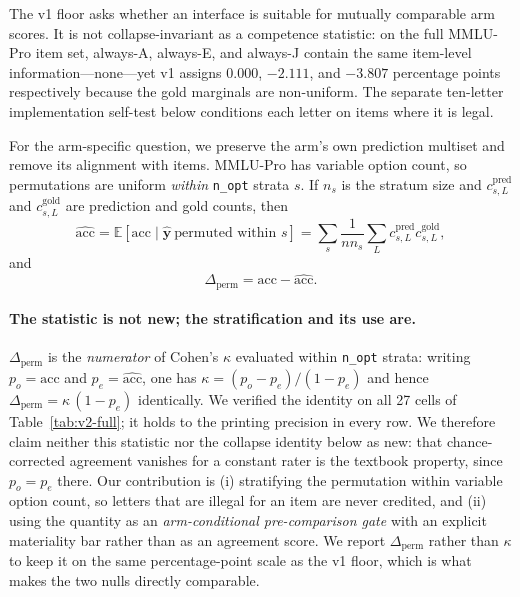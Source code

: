 The v1 floor asks whether an interface is suitable for mutually comparable arm scores. It is not collapse-invariant as a competence statistic: on the full MMLU-Pro item set, always-A, always-E, and always-J contain the same item-level information---none---yet v1 assigns 0.000, $-2.111$, and $-3.807$ percentage points respectively because the gold marginals are non-uniform. The separate ten-letter implementation self-test below conditions each letter on items where it is legal.

For the arm-specific question, we preserve the arm's own prediction multiset and remove its alignment with items. MMLU-Pro has variable option count, so permutations are uniform \emph{within} \texttt{n\_opt} strata $s$. If $n_{s}$ is the stratum size and $c^{\mathrm{pred}}_{s,L}$ and $c^{\mathrm{gold}}_{s,L}$ are prediction and gold counts, then
\begin{equation}
\widehat{\mathrm{acc}}
=\mathbb{E}[\mathrm{acc}\mid \hat{\boldsymbol y}\ \text{permuted within }s]
=\sum_s\frac{1}{n n_{s}}\sum_L c^{\mathrm{pred}}_{s,L}c^{\mathrm{gold}}_{s,L},
\end{equation}
and
\begin{equation}
    \Delta_{\mathrm{perm}}=\mathrm{acc}-\widehat{\mathrm{acc}}.
\end{equation}

\paragraph{The statistic is not new; the stratification and its use are.}
$\Delta_{\mathrm{perm}}$ is the \emph{numerator} of Cohen's $\kappa$ evaluated within
\texttt{n\_opt} strata: writing $p_o=\mathrm{acc}$ and $p_e=\widehat{\mathrm{acc}}$, one has
$\kappa=(p_o-p_e)/(1-p_e)$ and hence $\Delta_{\mathrm{perm}}=\kappa\,(1-p_e)$ identically.
We verified the identity on all 27 cells of Table~\ref{tab:v2-full}; it holds to the printing
precision in every row. We therefore claim neither this statistic nor the collapse identity
below as new: that chance-corrected agreement vanishes for a constant rater is the textbook
property, since $p_o=p_e$ there. Our contribution is (i) stratifying the permutation within
variable option count, so letters that are illegal for an item are never credited, and (ii)
using the quantity as an \emph{arm-conditional pre-comparison gate} with an explicit
materiality bar rather than as an agreement score. We report $\Delta_{\mathrm{perm}}$ rather
than $\kappa$ to keep it on the same percentage-point scale as the v1 floor, which is what
makes the two nulls directly comparable.

